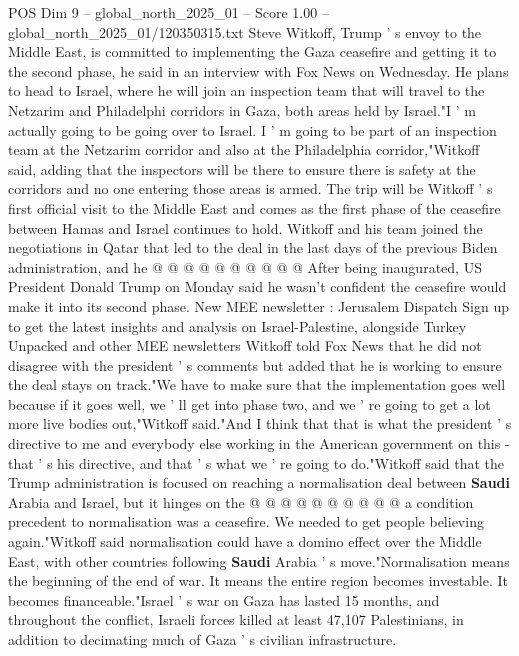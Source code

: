 \begin{textsample}{POS Dim 9 – global\_north\_2025\_01 – Score 1.00 – global\_north\_2025\_01/120350315.txt}  \label{ex:f9_pos_422}
Steve Witkoff, Trump ' s envoy to the Middle East, is committed to implementing the Gaza ceasefire and getting it to the second phase, he said in an interview with Fox News on Wednesday.
He plans to head to Israel, where he will join an inspection team that will travel to the Netzarim and Philadelphi corridors in Gaza, both areas held by Israel."I ' m actually going to be going over to Israel.
I ' m going to be part of an inspection team at the Netzarim corridor and also at the Philadelphia corridor,"Witkoff said, adding that the inspectors will be there to ensure there is safety at the corridors and no one entering those areas is armed.
The trip will be Witkoff ' s first official visit to the Middle East and comes as the first phase of the ceasefire between Hamas and Israel continues to hold.
Witkoff and his team joined the negotiations in Qatar that led to the deal in the last days of the previous Biden administration, and he @ @ @ @ @ @ @ @ @ @ After being inaugurated, US President Donald Trump on Monday said he wasn't confident the ceasefire would make it into its second phase.
New MEE newsletter : Jerusalem Dispatch Sign up to get the latest insights and analysis on Israel-Palestine, alongside Turkey Unpacked and other MEE newsletters Witkoff told Fox News that he did not disagree with the president ' s comments but added that he is working to ensure the deal stays on track."We have to make sure that the implementation goes well because if it goes well, we ' ll get into phase two, and we ' re going to get a lot more live bodies out,"Witkoff said."And I think that that is what the president ' s directive to me and everybody else working in the American government on this - that ' s his directive, and that ' s what we ' re going to do."Witkoff said that the Trump administration is focused on reaching a normalisation deal between \textbf{Saudi} Arabia and Israel, but it hinges on the @ @ @ @ @ @ @ @ @ @ a condition precedent to normalisation was a ceasefire.
We needed to get people believing again."Witkoff said normalisation could have a domino effect over the Middle East, with other countries following \textbf{Saudi} Arabia ' s move."Normalisation means the beginning of the end of war.
It means the entire region becomes investable.
It becomes financeable."Israel ' s war on Gaza has lasted 15 months, and throughout the conflict, Israeli forces killed at least 47,107 Palestinians, in addition to decimating much of Gaza ' s civilian infrastructure.

\end{textsample}
